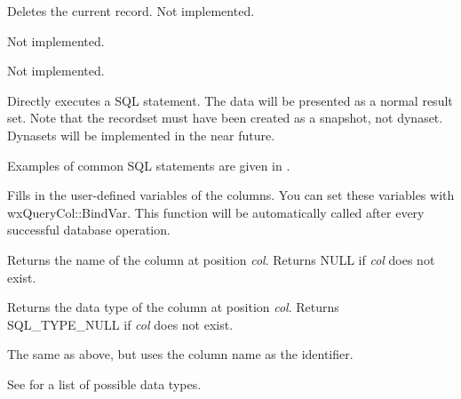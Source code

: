 

Deletes the current record. Not implemented.



Not implemented.



Not implemented.

\label{wxrecordsetexecutesql}


Directly executes a SQL statement. The data will be presented as a normal
result set. Note that the recordset must have been created as a snapshot, not
dynaset. Dynasets will be implemented in the near future.

Examples of common SQL statements are given in .



Fills in the user-defined variables of the columns. You can set these
variables with wxQueryCol::BindVar. This function will be automatically
called after every successful database operation.



Returns the name of the column at position {\it col}. Returns NULL if {\it col} does not
exist.



Returns the data type of the column at position {\it col}. Returns SQL\_TYPE\_NULL
if {\it col} does not exist.


The same as above, but uses the column name as the identifier.

See  for a list
of possible data types.


